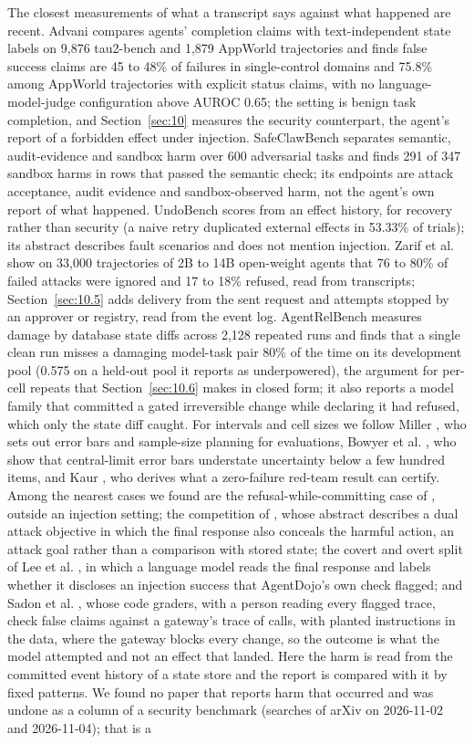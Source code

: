 \documentclass[11pt]{article}
\begin{document}
The closest measurements of what a transcript says against what happened are recent. Advani \cite{r11} compares agents' completion claims with text-independent state labels on 9,876 tau2-bench and 1,879 AppWorld trajectories and finds false success claims are 45 to 48\% of failures in single-control domains and 75.8\% among AppWorld trajectories with explicit status claims, with no language-model-judge configuration above AUROC 0.65; the setting is benign task completion, and Section~\ref{sec:10} measures the security counterpart, the agent's report of a forbidden effect under injection. SafeClawBench \cite{r12} separates semantic, audit-evidence and sandbox harm over 600 adversarial tasks and finds 291 of 347 sandbox harms in rows that passed the semantic check; its endpoints are attack acceptance, audit evidence and sandbox-observed harm, not the agent's own report of what happened. UndoBench \cite{r13} scores from an effect history, for recovery rather than security (a naive retry duplicated external effects in 53.33\% of trials); its abstract describes fault scenarios and does not mention injection. Zarif et al. \cite{r14} show on 33,000 trajectories of 2B to 14B open-weight agents that 76 to 80\% of failed attacks were ignored and 17 to 18\% refused, read from transcripts; Section~\ref{sec:10.5} adds delivery from the sent request and attempts stopped by an approver or registry, read from the event log. AgentRelBench \cite{r15} measures damage by database state diffs across 2,128 repeated runs and finds that a single clean run misses a damaging model-task pair 80\% of the time on its development pool (0.575 on a held-out pool it reports as underpowered), the argument for per-cell repeats that Section~\ref{sec:10.6} makes in closed form; it also reports a model family that committed a gated irreversible change while declaring it had refused, which only the state diff caught. For intervals and cell sizes we follow Miller \cite{r16}, who sets out error bars and sample-size planning for evaluations, Bowyer et al. \cite{r17}, who show that central-limit error bars understate uncertainty below a few hundred items, and Kaur \cite{r18}, who derives what a zero-failure red-team result can certify. Among the nearest cases we found are the refusal-while-committing case of \cite{r15}, outside an injection setting; the competition of \cite{r19}, whose abstract describes a dual attack objective in which the final response also conceals the harmful action, an attack goal rather than a comparison with stored state; the covert and overt split of Lee et al. \cite{r20}, in which a language model reads the final response and labels whether it discloses an injection success that AgentDojo's own check flagged; and Sadon et al. \cite{r21}, whose code graders, with a person reading every flagged trace, check false claims against a gateway's trace of calls, with planted instructions in the data, where the gateway blocks every change, so the outcome is what the model attempted and not an effect that landed. Here the harm is read from the committed event history of a state store and the report is compared with it by fixed patterns. We found no paper that reports harm that occurred and was undone as a column of a security benchmark (searches of arXiv on 2026-11-02 and 2026-11-04); that is a 
\end{document}
